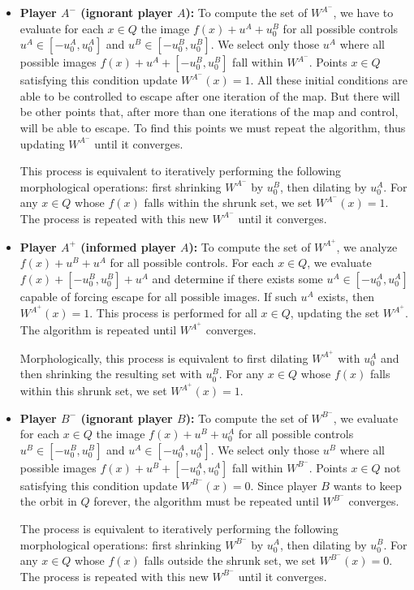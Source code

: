 \begin{itemize}
\item {\bf Player $A^-$ (ignorant player $A$):}
To compute the set of $W^{A^-}$, we have to evaluate for each $x \in Q$ the image $f(x)+u^A+u_0^B$ for all possible controls $u^A \in [-u_0^A,u_0^A]$ and $u^B \in [-u_0^B,u_0^B]$. We select only those $u^A$ where all possible images $f(x)+u^A+[-u_0^B,u_0^B]$ fall within $W^{A^-}$. Points $x \in Q$ satisfying this condition update $W^{A^-}(x)=1$. All these initial conditions are able to be controlled to escape after one iteration of the map. But there will be other points that, after more than one iterations of the map and control, will be able to escape. To find this points we must repeat the algorithm, thus updating $W^{A^-}$ until it converges.

This process is equivalent to iteratively performing the following morphological operations: first shrinking $W^{A^-}$ by $u_0^B$, then dilating by $u_0^A$. For any $x \in Q$ whose $f(x)$ falls within the shrunk set, we set $W^{A^-}(x)=1$. The process is repeated with this new $W^{A^-}$ until it converges.

\item {\bf Player $A^+$ (informed player $A$):}
To compute the set of $W^{A^+}$, we analyze $f(x)+u^B+u^A$ for all possible controls. For each $x \in Q$, we evaluate $f(x)+[-u_0^B,u_0^B]+u^A$ and determine if there exists some $u^A \in [-u_0^A,u_0^A]$ capable of forcing escape for all possible images. If such $u^A$ exists, then $W^{A^+}(x)=1$. This process is performed for all $x \in Q$, updating the set $W^{A^+}$. The algorithm is repeated until $W^{A^+}$ converges.

Morphologically, this process is equivalent to first dilating $W^{A^+}$ with $u_0^A$ and then shrinking the resulting set with $u_0^B$. For any $x \in Q$ whose $f(x)$ falls within this shrunk set, we set $W^{A^+}(x)=1$.

\item {\bf Player $B^-$ (ignorant player $B$):}
To compute the set of $W^{B^-}$, we evaluate for each $x \in Q$ the image $f(x)+u^B+u_0^A$ for all possible controls $u^B \in [-u_0^B,u_0^B]$ and $u^A \in [-u_0^A,u_0^A]$. We select only those $u^B$ where all possible images $f(x)+u^B+[-u_0^A,u_0^A]$ fall within $W^{B^-}$. Points $x \in Q$ not satisfying this condition update $W^{B^-}(x)=0$. Since player $B$ wants to keep the orbit in $Q$ forever, the algorithm must be repeated until $W^{B^-}$ converges.

The process is equivalent to iteratively performing the following morphological operations: first shrinking $W^{B^-}$ by $u_0^A$, then dilating by $u_0^B$. For any $x \in Q$ whose $f(x)$ falls outside the shrunk set, we set $W^{B^-}(x)=0$. The process is repeated with this new $W^{B^-}$ until it converges.


\end{itemize}
